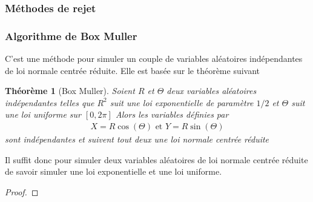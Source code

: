 \documentclass[a4paper]{article}
\newtheorem{theorem}{Théorème}[section]
\newtheorem{proof}{Démonstration}
\begin{document}
\subsubsection{Méthodes de rejet}

\subsubsection{Algorithme de Box Muller}
C’est une méthode pour simuler un couple de variables aléatoires indépendantes de loi normale centrée réduite. Elle est basée sur le théorème suivant

\begin{theorem}[Box Muller]
    Soient $R$ et $\Theta$ deux variables aléatoires indépendantes telles que $R^2$ suit une loi exponentielle de paramètre $1/2$ et $\Theta$ suit une loi uniforme sur $[0, 2\pi]$ Alors les variables définies par 
    \begin{align*}
        X = R\cos(\Theta) \text{    et    } Y = R\sin(\Theta)
    \end{align*}
    sont indépendantes et suivent tout deux une loi normale centrée réduite
\end{theorem}
Il suffit donc pour simuler deux variables aléatoires de loi normale centrée réduite de savoir simuler une loi exponentielle et une loi uniforme.
\begin{proof}
    
\end{proof}
\end{document}
